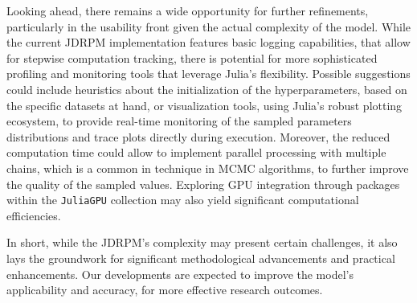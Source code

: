 \documentclass[12pt,	%
	a4paper,		%
	twoside,		%
	openright,		%
	titlepage,%
	]{book}
\theoremstyle{definition}
\newcommand{\mjline}[1]{\texttt{#1}}
\begin{document}

Looking ahead, there remains a wide opportunity for further refinements, particularly in the usability front given the actual complexity of the model. While the current JDRPM implementation features basic logging capabilities, that allow for stepwise computation tracking, there is potential for more sophisticated profiling and monitoring tools that leverage Julia's flexibility. Possible suggestions could include heuristics about the initialization of the hyperparameters, based on the specific datasets at hand, or visualization tools, using Julia's robust plotting ecosystem, to provide real-time monitoring of the sampled parameters distributions and trace plots directly during execution.
Moreover, the reduced computation time could allow to implement parallel processing with multiple chains, which is a common in technique in MCMC algorithms, to further improve the quality of the sampled values. Exploring GPU integration through packages within the \mjline{JuliaGPU} collection may also yield significant computational efficiencies.

In short, while the JDRPM's complexity may present certain challenges, it also lays the groundwork for significant methodological advancements and practical enhancements. Our developments are expected to improve the model's applicability and accuracy, for more effective research outcomes.

\end{document}
